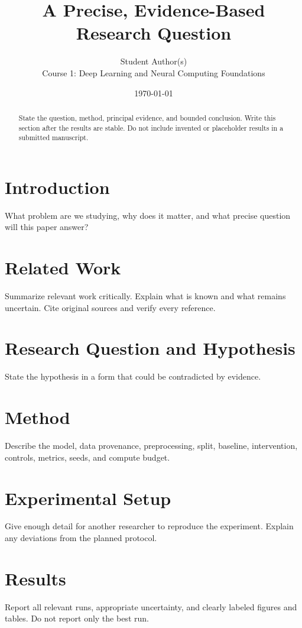 \documentclass[11pt]{article}
\title{A Precise, Evidence-Based Research Question}
\author{Student Author(s)\\
\small Course 1: Deep Learning and Neural Computing Foundations}
\date{\today}
\begin{document}
\maketitle

\begin{abstract}
State the question, method, principal evidence, and bounded conclusion.
Write this section after the results are stable. Do not include invented
or placeholder results in a submitted manuscript.
\end{abstract}

\section{Introduction}
What problem are we studying, why does it matter, and what precise question
will this paper answer?

\section{Related Work}
Summarize relevant work critically. Explain what is known and what remains
uncertain. Cite original sources and verify every reference.

\section{Research Question and Hypothesis}
State the hypothesis in a form that could be contradicted by evidence.

\section{Method}
Describe the model, data provenance, preprocessing, split, baseline,
intervention, controls, metrics, seeds, and compute budget.

\section{Experimental Setup}
Give enough detail for another researcher to reproduce the experiment.
Explain any deviations from the planned protocol.

\section{Results}
Report all relevant runs, appropriate uncertainty, and clearly labeled
figures and tables. Do not report only the best run.
\end{document}
